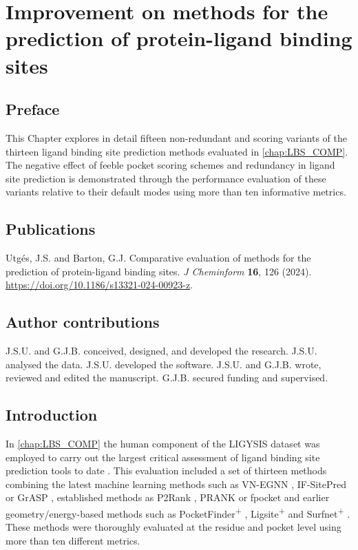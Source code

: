 \chapter{Improvement on methods for the prediction of protein-ligand binding sites}
\label{chap:LBS_IMPROV}

\section*{Preface}

This Chapter explores in detail fifteen non-redundant and scoring variants of the thirteen ligand binding site prediction methods evaluated in \autoref{chap:LBS_COMP}. The negative effect of feeble pocket scoring schemes and redundancy in ligand site prediction is demonstrated through the performance evaluation of these variants relative to their default modes using more than ten informative metrics.

\section*{Publications}

Utgés, J.S. and Barton, G.J. Comparative evaluation of methods for the prediction of protein-ligand binding sites. \textit{J Cheminform} \textbf{16}, 126 (2024). \url{https://doi.org/10.1186/s13321-024-00923-z}.

\section*{Author contributions}

J.S.U. and G.J.B. conceived, designed, and developed the research. J.S.U. analysed the data. J.S.U. developed the software. J.S.U. and G.J.B. wrote, reviewed and edited the manuscript. G.J.B. secured funding and supervised.

\section{Introduction}

In \autoref{chap:LBS_COMP} the human component of the LIGYSIS dataset was employed to carry out the largest critical assessment of ligand binding site prediction tools to date \cite{UTGES_2024_LBSCOMP}. This evaluation included a set of thirteen methods combining the latest machine learning methods such as VN-EGNN \cite{SESTAK_2024_VNEGNN}, IF-SitePred \cite{CARBERY_2024_IFSP} or GrASP \cite{SMITH_2024_GrASP}, established methods as P2Rank \cite{KRIVAK_2015_P2RANK, KRIVAK_2018_P2RANK}, PRANK \cite{KRIVAK_2015_PRANK} or fpocket \cite{GUILLOUX_2009_FPOCKET, SCHMIDTKE_2010_FPOCKET2} and earlier geometry/energy-based methods such as PocketFinder\textsuperscript{+} \cite{AN_2005_POCKETFINDER}, Ligsite\textsuperscript{+} \cite{HENDLICH_1997_LIGSITE} and Surfnet\textsuperscript{+} \cite{LASKOWSKI_1995_SURFNET}. These methods were thoroughly evaluated at the residue and pocket level using more than ten different metrics.

